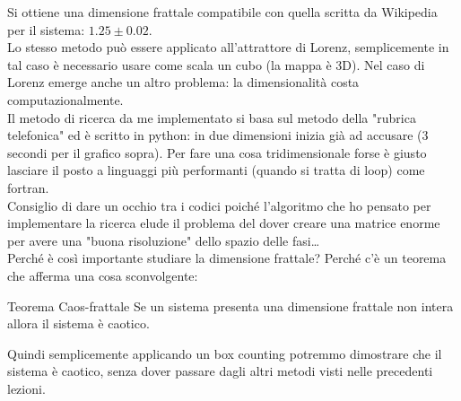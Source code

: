 \noindent
Si ottiene una dimensione frattale compatibile con quella scritta da Wikipedia per il sistema: $1.25 \pm 0.02$.\\
Lo stesso metodo può essere applicato all'attrattore di Lorenz, semplicemente in tal caso è necessario usare come scala un cubo (la mappa è 3D).
Nel caso di Lorenz emerge anche un altro problema: la dimensionalità costa computazionalmente. \\
Il metodo di ricerca da me implementato si basa sul metodo della "rubrica telefonica" ed è scritto in python: in due dimensioni inizia già ad accusare (3 secondi per il grafico sopra). Per fare una cosa tridimensionale forse è giusto lasciare il posto a linguaggi più performanti (quando si tratta di loop) come fortran.\\
Consiglio di dare un occhio tra i codici poiché l'algoritmo che ho pensato per implementare la ricerca elude il problema del dover creare una matrice enorme per avere una "buona risoluzione" dello spazio delle fasi\ldots\\
Perché è così importante studiare la dimensione frattale? Perché c'è un teorema che afferma una cosa sconvolgente:
\begin{redbox}{Teorema Caos-frattale}
    Se un sistema presenta una dimensione frattale non intera allora il sistema è caotico.
\end{redbox}
\noindent
Quindi semplicemente applicando un box counting potremmo dimostrare che il sistema è caotico, senza dover passare dagli altri metodi visti nelle precedenti lezioni.\\
